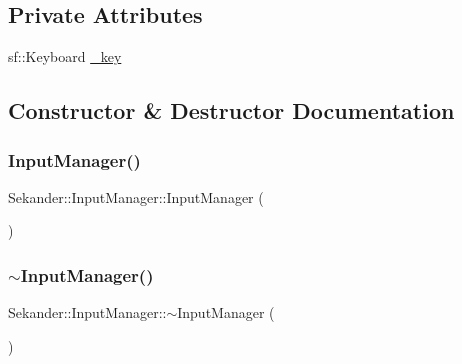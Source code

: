 \subsection*{Private Attributes}
\begin{DoxyCompactItemize}
\item 
sf\+::\+Keyboard \hyperlink{classSekander_1_1InputManager_aea65e79014e4b92dbce7fefae50b0022}{\+\_\+key}
\end{DoxyCompactItemize}


\subsection{Constructor \& Destructor Documentation}
\mbox{\label{classSekander_1_1InputManager_ab171e3428df1026155f91bbb49fe5a4a}} 
\subsubsection{\texorpdfstring{Input\+Manager()}{InputManager()}}
{\footnotesize\ttfamily Sekander\+::\+Input\+Manager\+::\+Input\+Manager (\begin{DoxyParamCaption}{ }\end{DoxyParamCaption})\hspace{0.3cm}{\ttfamily [inline]}}

\mbox{\label{classSekander_1_1InputManager_ade61718adb0fa9db1a428e3ce6332542}} 
\subsubsection{\texorpdfstring{$\sim$\+Input\+Manager()}{~InputManager()}}
{\footnotesize\ttfamily Sekander\+::\+Input\+Manager\+::$\sim$\+Input\+Manager (\begin{DoxyParamCaption}{ }\end{DoxyParamCaption})\hspace{0.3cm}{\ttfamily [inline]}}



